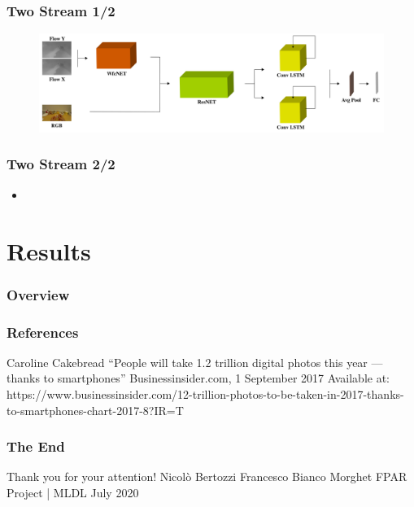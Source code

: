 \documentclass{beamer}
\begin{document}
\begin{frame}
\frametitle{Two Stream 1/2}

\begin{figure}
\centering
\includegraphics[width=\textwidth]{../schemi/two_stream}
\end{figure}
 
\end{frame}

\begin{frame}
\frametitle{Two Stream 2/2}

\begin{itemize}
\item
\end{itemize}
 
\end{frame}
  
\section{Results}

\begin{frame}
\frametitle{Overview} 
	\tableofcontents[currentsection]
\end{frame}
     
\begin{frame}
\frametitle{References}
   \begin{thebibliography}{9}
		Caroline Cakebread
		\newblock “People will take 1.2 trillion digital photos this year — thanks to smartphones”
		\newblock Businessinsider.com, 1 September 2017
		\newblock Available at: https://www.businessinsider.com/12-trillion-photos-to-be-taken-in-2017-thanks-to-smartphones-chart-2017-8?IR=T
   \end{thebibliography}
\end{frame}

\begin{frame}
\centering
\frametitle{The End}
\Huge Thank you for your attention!
\break
\break
\break
\break
\large Nicolò Bertozzi
\break
Francesco Bianco Morghet
\break
\break
FPAR Project | MLDL
 July 2020
\end{frame}
\end{document}
